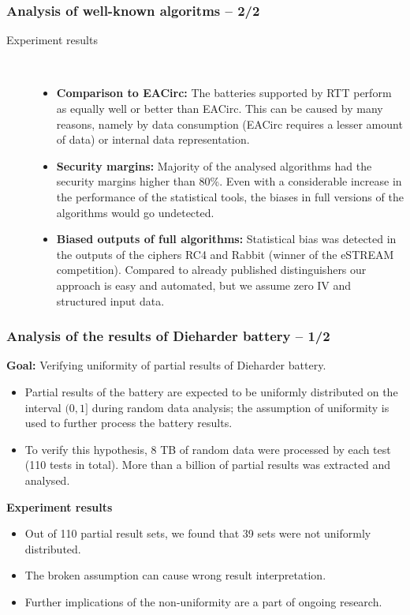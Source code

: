 \documentclass[aspectratio=169]{beamer}
\begin{document}
\begin{frame}
\frametitle{Analysis of well-known algoritms -- 2/2}

\begin{description}
\item[Experiment results] \hfill \\
\begin{itemize}
\item \textbf{Comparison to EACirc:} The batteries supported by RTT perform as equally well or better than EACirc. This can be caused by many reasons, namely by data consumption (EACirc requires a lesser amount of data) or internal data representation.
\item \textbf{Security margins:} Majority of the analysed algorithms had the security margins higher than 80\%. Even with a considerable increase in the performance of the statistical tools, the biases in full versions of the algorithms would go undetected.
\item \textbf{Biased outputs of full algorithms:} Statistical bias was detected in the outputs of the ciphers RC4 and Rabbit (winner of the eSTREAM competition). Compared to already published distinguishers our approach is easy and automated, but we assume zero IV and structured input data.
\end{itemize}
\end{description}

\end{frame}

\begin{frame}
\frametitle{Analysis of the results of Dieharder battery -- 1/2}
\textbf{Goal:} Verifying uniformity of partial results of Dieharder battery.

\begin{itemize}
\item Partial results of the battery are expected to be uniformly distributed on the interval $(0,1]$ during random data analysis; the assumption of uniformity is used to further process the battery results.
\item To verify this hypothesis, 8 TB of random data were processed by each test (110 tests in total). More than a billion of partial results was extracted and analysed.
\end{itemize}
\textbf{Experiment results}
\begin{itemize}
\item Out of 110 partial result sets, we found that 39 sets were not uniformly distributed.
\item The broken assumption can cause wrong result interpretation.
\item Further implications of the non-uniformity are a part of ongoing research.
\end{itemize}
\end{frame}
\end{document}
